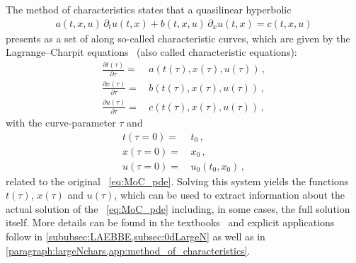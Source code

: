 The method of characteristics states that a quasilinear hyperbolic \pde{}
\begin{align}
	a ( t, x, u ) \, \partial_t u ( t, x ) + b ( t, x, u ) \, \partial_x u ( t, x ) = c ( t, x, u )	\label{eq:MoC_pde}
\end{align}
presents as a set of \odes{} along so-called characteristic curves, which are given by the Lagrange–Charpit equations~\cite{Delgado2006Aug} (also called characteristic equations):
\begin{subequations}\label{eq:MoC_odes}
\begin{align}
	\frac{\partial t ( \tau )}{\partial \tau} = \, & a ( t ( \tau ), x ( \tau ), u ( \tau ) ) \, ,
	\label{eq:MoC_ode_1}\\
	\frac{\partial x ( \tau )}{\partial \tau} = \, & b ( t ( \tau ), x ( \tau ), u ( \tau ) ) \, ,
	\label{eq:MoC_ode_2}\\
	\frac{\partial u( \tau )}{\partial \tau} = \, & c ( t ( \tau ), x ( \tau ), u ( \tau ) ) \, ,
	\label{eq:MoC_ode_3}
\end{align}
\end{subequations}
with the curve-parameter $\tau$ and \ics{}
\begin{subequations}\label{eq:MoC_ics}
\begin{align}
	t ( \tau = 0 ) = \, & t_0 \, ,
	\label{eq:MoC_ics_1}\\
	x ( \tau = 0 ) = \, & x_0 \, ,
	\label{eq:MoC_ics_2}\\
	u ( \tau = 0 ) = \, & u_0 ( t_0, x_0 ) \, ,
	\label{eq:MoC_ics_3}
\end{align}
\end{subequations}
related to the original \pde{}~\eqref{eq:MoC_pde}. 
Solving this \ode{} system yields the functions $t(\tau)$, $x(\tau)$ and $u(\tau)$, which can be used to extract information about the actual solution of the \pde{}~\eqref{eq:MoC_pde} including, in some cases, the full solution itself.
More details can be found in the textbooks~\cite{Ames:1992,LeVeque:1992,LeVeque:2002,Hesthaven2007,polyanin2016handbook,Vazquez-Cendon2015} and explicit applications follow in \cref{sububsec:LAEBBE,subsec:0dLargeN} as well as in \cref{paragraph:largeNchars,app:method_of_characteristics}. 

